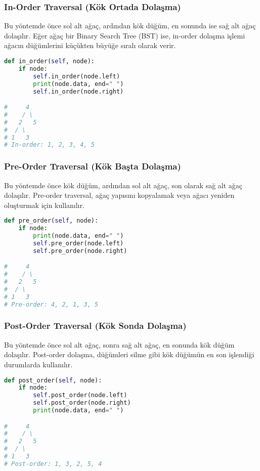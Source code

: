 \newpage

\subsubsection{In-Order Traversal (Kök Ortada Dolaşma)}

Bu yöntemde önce sol alt ağaç, ardından kök düğüm, en sonunda ise sağ alt ağaç dolaşılır. Eğer ağaç bir Binary Search Tree (BST) ise, in-order dolaşma işlemi ağacın düğümlerini küçükten büyüğe sıralı olarak verir.

\begin{lstlisting}[language=Python]
def in_order(self, node):
    if node:
        self.in_order(node.left)
        print(node.data, end=" ")
        self.in_order(node.right)

#     4
#    / \
#   2   5
#  / \
# 1   3
# In-order: 1, 2, 3, 4, 5
\end{lstlisting}

\newpage

\subsubsection{Pre-Order Traversal (Kök Başta Dolaşma)}

Bu yöntemde önce kök düğüm, ardından sol alt ağaç, son olarak sağ alt ağaç dolaşılır. Pre-order traversal, ağaç yapısını kopyalamak veya ağacı yeniden oluşturmak için kullanılır.

\begin{lstlisting}[language=Python]
def pre_order(self, node):
    if node:
        print(node.data, end=" ")
        self.pre_order(node.left)
        self.pre_order(node.right)

#     4
#    / \
#   2   5
#  / \
# 1   3
# Pre-order: 4, 2, 1, 3, 5
\end{lstlisting}

\newpage

\subsubsection{Post-Order Traversal (Kök Sonda Dolaşma)}

Bu yöntemde önce sol alt ağaç, sonra sağ alt ağaç, en sonunda kök düğüm dolaşılır. Post-order dolaşma, düğümleri silme gibi kök düğümün en son işlendiği durumlarda kullanılır.

\begin{lstlisting}[language=Python]
def post_order(self, node):
    if node:
        self.post_order(node.left)
        self.post_order(node.right)
        print(node.data, end=" ")

#     4
#    / \
#   2   5
#  / \
# 1   3
# Post-order: 1, 3, 2, 5, 4
\end{lstlisting}

